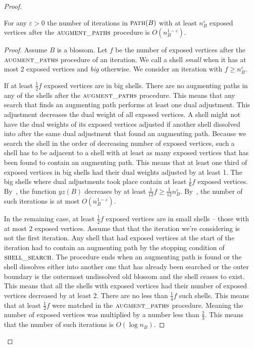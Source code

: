 \begin{proof}
\begin{lemma}\label{lem:epsilon}
    For any $\varepsilon > 0$ the number of iterations in $\textsc{path}(B)$ with at least $n_B^\varepsilon$ exposed vertices after the $\textsc{augment\_paths}$ procedure is $O(n_B^{1-\varepsilon})$.
\end{lemma}

\begin{proof}
    Assume $B$ is a blossom. Let $f$ be the number of exposed vertices after the $\textsc{augment\_paths}$ procedure of an iteration. We call a shell \textit{small} when it has at most $2$ exposed vertices and \textit{big} otherwise. We consider an iteration with $f \geq n_B^\varepsilon$.

    If at least $\frac{1}{2}f$ exposed vertices are in big shells. There are no augmenting paths in any of the shells after the $\textsc{augment\_paths}$ procedure. This means that any search that finds an augmenting path performs at least one dual adjustment. This adjustment decreases the dual weight of all exposed vertices. A shell might not have the dual weights of its exposed vertices adjusted if another shell dissolved into after the same dual adjustment that found an augmenting path. Because we search the shell in the order of decreasing number of exposed vertices, such a shell has to be adjacent to a shell with at least as many exposed vertices that has been found to contain an augmenting path. This means that at least one third of exposed vertices in big shells had their dual weights adjusted by at least 1. The big shells where dual adjustments took place contain at least $\frac{1}{6}f$ exposed vertices. By~, the function $yz(B)$ decreases by at least $\frac{1}{12}f \geq \frac{1}{12}n_B^\varepsilon$. By~, the number of such iterations is at most $O(n_B^{1-\varepsilon})$.

    In the remaining case, at least $\frac{1}{2}f$ exposed vertices are in small shells – those with at most 2 exposed vertices. Assume that that the iteration we're considering is not the first iteration. Any shell that had exposed vertices at the start of the iteration had to contain an augmenting path by the stopping condition of $\textsc{shell\_search}$. The procedure ends when an augmenting path is found or the shell dissolves either into another one that has already been searched or the outer boundary is the outermost undissolved old blossom and the shell ceases to exist. This means that all the shells with exposed vertices had their number of exposed vertices decreased by at least 2. There are no less than $\frac{1}{4}f$ such shells. This means that at least $\frac{1}{2}f$ were matched in the $\textsc{augment\_paths}$ procedure. Meaning the number of exposed vertices was multiplied by a number less than $\frac{2}{3}$. This means that the number of such iterations is $O(\log n_B)$.
\end{proof}


\end{proof}

